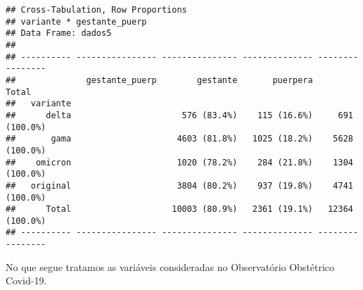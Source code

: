 \documentclass[
]{article}
\newenvironment{Shaded}{\begin{snugshade}}{\end{snugshade}}
\newcommand{\AttributeTok}[1]{\textcolor[rgb]{0.77,0.63,0.00}{#1}}
\newcommand{\ConstantTok}[1]{\textcolor[rgb]{0.00,0.00,0.00}{#1}}
\newcommand{\DecValTok}[1]{\textcolor[rgb]{0.00,0.00,0.81}{#1}}
\newcommand{\FunctionTok}[1]{\textcolor[rgb]{0.00,0.00,0.00}{#1}}
\newcommand{\NormalTok}[1]{#1}
\newcommand{\OtherTok}[1]{\textcolor[rgb]{0.56,0.35,0.01}{#1}}
\newcommand{\SpecialCharTok}[1]{\textcolor[rgb]{0.00,0.00,0.00}{#1}}
\newcommand{\StringTok}[1]{\textcolor[rgb]{0.31,0.60,0.02}{#1}}
\begin{document}
\begin{Shaded}
\end{Shaded}

\begin{verbatim}
## Cross-Tabulation, Row Proportions  
## variante * gestante_puerp  
## Data Frame: dados5  
## 
## ---------- ---------------- --------------- -------------- ----------------
##              gestante_puerp        gestante       puerpera            Total
##   variante                                                                 
##      delta                      576 (83.4%)    115 (16.6%)     691 (100.0%)
##       gama                     4603 (81.8%)   1025 (18.2%)    5628 (100.0%)
##    omicron                     1020 (78.2%)    284 (21.8%)    1304 (100.0%)
##   original                     3804 (80.2%)    937 (19.8%)    4741 (100.0%)
##      Total                    10003 (80.9%)   2361 (19.1%)   12364 (100.0%)
## ---------- ---------------- --------------- -------------- ----------------
\end{verbatim}

No que segue tratamos as variáveis consideradas no Observatório
Obstétrico Covid-19.
\end{document}
